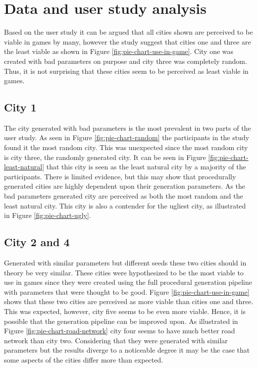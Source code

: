 \section{Data and user study analysis}
	Based on the user study it can be argued that all cities shown are perceived to be viable in games by many, however the study suggest that cities one and three are the least viable as shown in Figure \ref{fig:pie-chart-use-in-game}. City one was created with bad parameters on purpose and city three was completely random. Thus, it is not surprising that these cities seem to be perceived as least viable in games.
	
	\subsection{City 1}
		The city generated with bad parameters is the most prevalent in two parts of the user study. As seen in Figure \ref{fig:pie-chart-random} the participants in the study found it the most random city. This was unexpected since the most random city is city three, the randomly generated city. It can be seen in Figure \ref{fig:pie-chart-least-natural} that this city is seen as the least natural city by a majority of the participants. There is limited evidence, but this may show that procedurally generated cities are highly dependent upon their generation parameters. As the bad parameters generated city are perceived as both the most random and the least natural city. This city is also a contender for the ugliest city, as illustrated in Figure \ref{fig:pie-chart-ugly}.
		
	\subsection{City 2 and 4} \label{ssec:city2-3}
		Generated with similar parameters but different seeds these two cities should in theory be very similar. These cities were hypothesized to be the most viable to use in games since they were created using the full procedural generation pipeline with parameters that were thought to be good. Figure \ref{fig:pie-chart-use-in-game} shows that these two cities are perceived as more viable than cities one and three. This was expected, however, city five seems to be even more viable. Hence, it is possible that the generation pipeline can be improved upon. As illustrated in Figure \ref{fig:pie-chart-road-network} city four seems to have much better road network than city two. Considering that they were generated with similar parameters but the results diverge to a noticeable degree it may be the case that some aspects of the cities differ more than expected.

